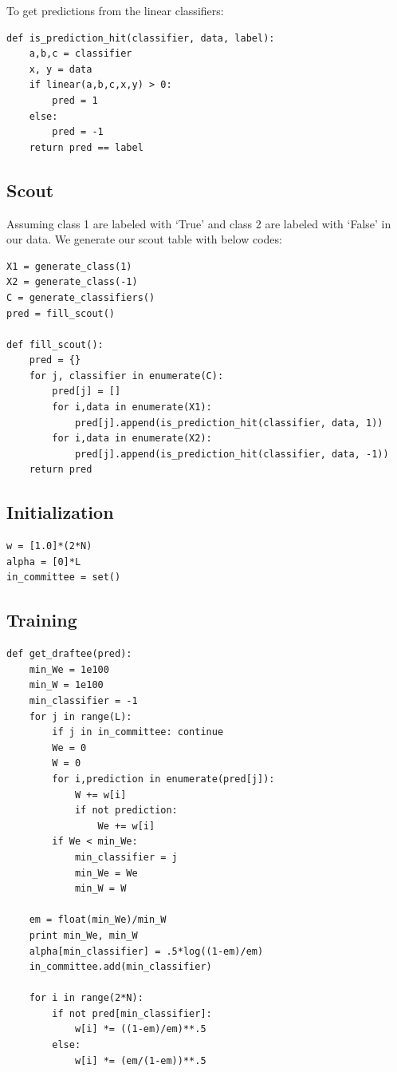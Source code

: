 \documentclass[]{article}  %
\begin{document}
To get predictions from the linear classifiers:

\begin{verbatim}
def is_prediction_hit(classifier, data, label):
    a,b,c = classifier
    x, y = data
    if linear(a,b,c,x,y) > 0:
        pred = 1
    else:
        pred = -1
    return pred == label
\end{verbatim}

\subsection{Scout}
Assuming class 1 are labeled with `True' and class 2 are labeled with `False' in our data. We generate our scout table with below codes:
\begin{verbatim}
X1 = generate_class(1)
X2 = generate_class(-1)
C = generate_classifiers()
pred = fill_scout()

def fill_scout():
    pred = {}
    for j, classifier in enumerate(C):
        pred[j] = []
        for i,data in enumerate(X1):
            pred[j].append(is_prediction_hit(classifier, data, 1))
        for i,data in enumerate(X2):
            pred[j].append(is_prediction_hit(classifier, data, -1))
    return pred
\end{verbatim}

\subsection{Initialization}
\begin{verbatim}
w = [1.0]*(2*N)
alpha = [0]*L
in_committee = set()
\end{verbatim}

\subsection{Training}
\begin{verbatim}
def get_draftee(pred):
    min_We = 1e100
    min_W = 1e100
    min_classifier = -1
    for j in range(L):
        if j in in_committee: continue
        We = 0
        W = 0
        for i,prediction in enumerate(pred[j]):
            W += w[i]
            if not prediction:
                We += w[i]
        if We < min_We:
            min_classifier = j
            min_We = We
            min_W = W
            
    em = float(min_We)/min_W
    print min_We, min_W
    alpha[min_classifier] = .5*log((1-em)/em)
    in_committee.add(min_classifier)
    
    for i in range(2*N):
        if not pred[min_classifier]:
            w[i] *= ((1-em)/em)**.5
        else:
            w[i] *= (em/(1-em))**.5 
\end{verbatim}
\end{document}
